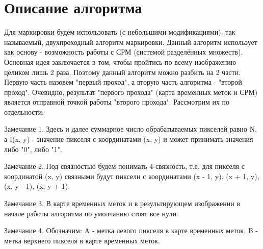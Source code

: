 \documentclass{report}
\begin{document}
	\section*{Описание алгоритма}
		\par Для маркировки будем использовать (с небольшими модификациями), так называемый, двухпроходный алгоритм маркировки. Данный алгоритм использует как основу - возможность работы с СРМ (системой разделённых множеств). Основная идея заключается в том, чтобы пройтись по всему изображению целиком лишь 2 раза. Поэтому данный алгоритм можно разбить на 2 части. Первую часть назовём "первый проход"{}, а вторую часть алгоритма - "второй проход"{}. Очевидно, результат "первого прохода"{} (карта временных меток и СРМ) является отправной точкой работы "второго прохода"{}. Рассмотрим их по отдельности:
		\par Замечание 1. Здесь и далее суммарное число обрабатываемых пикселей равно N, а I(x, y) - значение пикселя с координатами (x, y) и может принимать значения либо "0"{}, либо "1"{}.
		\par Замечание 2. Под связностью будем понимать 4-связность, т.е. для пикселя с координатой (x, y) связными будут пиксели с координатами (x - 1, y), (x + 1, y), (x, y - 1), (x, y + 1).
		\par Замечание 3. В карте временных меток и в результирующем изображении в начале работы алгоритма по умолчанию стоят все нули.
		\par Замечание 4. Обозначим: A - метка левого пикселя в карте временных меток, B - метка верхнего пикселя в карте временных меток.
\end{document}
